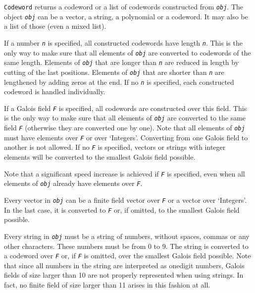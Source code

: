 \documentclass[a4paper,11pt]{report}
\begin{document}
{{{ \texttt{Codeword} returns a codeword or a list of codewords constructed from \mbox{\texttt{\mdseries\slshape obj}}. The object \mbox{\texttt{\mdseries\slshape obj}} can be a vector, a string, a polynomial or a codeword. It may also be a list
of those (even a mixed list). 

 If a number \mbox{\texttt{\mdseries\slshape n}} is specified, all constructed codewords have length \mbox{\texttt{\mdseries\slshape n}}. This is the only way to make sure that all elements of \mbox{\texttt{\mdseries\slshape obj}} are converted to codewords of the same length. Elements of \mbox{\texttt{\mdseries\slshape obj}} that are longer than \mbox{\texttt{\mdseries\slshape n}} are reduced in length by cutting of the last positions. Elements of \mbox{\texttt{\mdseries\slshape obj}} that are shorter than \mbox{\texttt{\mdseries\slshape n}} are lengthened by adding zeros at the end. If no \mbox{\texttt{\mdseries\slshape n}} is specified, each constructed codeword is handled individually. 

 If a Galois field \mbox{\texttt{\mdseries\slshape F}} is specified, all codewords are constructed over this field. This is the only
way to make sure that all elements of \mbox{\texttt{\mdseries\slshape obj}} are converted to the same field \mbox{\texttt{\mdseries\slshape F}} (otherwise they are converted one by one). Note that all elements of \mbox{\texttt{\mdseries\slshape obj}} must have elements over \mbox{\texttt{\mdseries\slshape F}} or over `Integers'. Converting from one Galois field to another is not
allowed. If no \mbox{\texttt{\mdseries\slshape F}} is specified, vectors or strings with integer elements will be converted to
the smallest Galois field possible. 

 Note that a significant speed increase is achieved if \mbox{\texttt{\mdseries\slshape F}} is specified, even when all elements of \mbox{\texttt{\mdseries\slshape obj}} already have elements over \mbox{\texttt{\mdseries\slshape F}}. 

 Every vector in \mbox{\texttt{\mdseries\slshape obj}} can be a finite field vector over \mbox{\texttt{\mdseries\slshape F}} or a vector over `Integers'. In the last case, it is converted to \mbox{\texttt{\mdseries\slshape F}} or, if omitted, to the smallest Galois field possible. 

 Every string in \mbox{\texttt{\mdseries\slshape obj}} must be a string of numbers, without spaces, commas or any other characters.
These numbers must be from 0 to 9. The string is converted to a codeword over \mbox{\texttt{\mdseries\slshape F}} or, if \mbox{\texttt{\mdseries\slshape F}} is omitted, over the smallest Galois field possible. Note that since all
numbers in the string are interpreted as one\texttt{}digit numbers,
Galois fields of size larger than 10 are not properly represented when using
strings. In fact, no finite field of size larger than 11 arises in this
fashion at all. 

}}}
\end{document}
